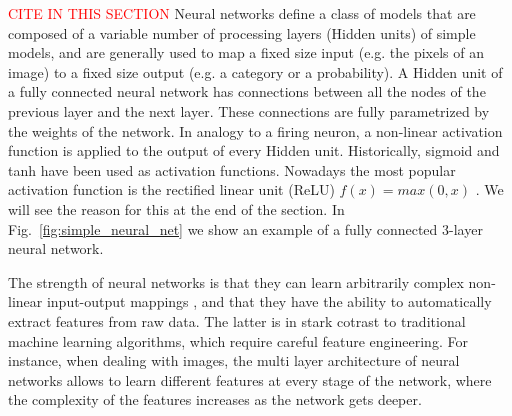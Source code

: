 \textcolor{red}{CITE IN THIS SECTION}
Neural networks define a class of models that are composed of a variable number of processing layers (Hidden units) of simple models, and are generally used to map a fixed size input (e.g. the pixels of an image) to a fixed size output (e.g. a category or a probability). A Hidden unit of a fully connected neural network has connections between all the nodes of the previous layer and the next layer. These connections are fully parametrized by the weights of the network. In analogy to a firing neuron, a non-linear activation function is applied to the output of every Hidden unit. Historically, sigmoid and tanh have been used as activation functions. Nowadays the most popular activation function is the rectified linear unit (ReLU) $f(x) = max(0,x)$ \parencite{glorot2011}. We will see the reason for this at the end of the section. 
In Fig.~\ref{fig:simple_neural_net} we show an example of a fully connected 3-layer neural network. 

The strength of neural networks is that they can learn arbitrarily complex non-linear input-output mappings \parencite{cybenko1989}, and that they have the ability to automatically extract features from raw data. The latter is in stark cotrast to traditional machine learning algorithms, which require careful feature engineering. For instance, when dealing with images, the multi layer architecture of neural networks allows to learn different features at every stage of the network, where the complexity of the features increases as the network gets deeper.

